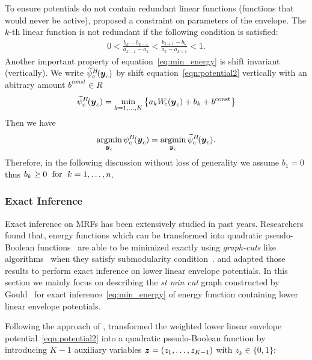 \documentclass[sigconf,anonymous,review]{acmart}
\renewcommand{\citename}{\citet}
\renewcommand{\cite}{\citep}
\begin{document}
To ensure potentials do not contain redundant linear functions
(functions that would never be active), \citename{gouldlearning}
proposed a constraint on parameters of the envelope. The $k$-th
linear function is not redundant if the following condition is
satisfied:
%
\begin{align}
    0
    <
    \frac{b_k - b_{k-1}}{a_{k-1} - a_k}
    <
    \frac{b_{k+1} - b_k}{a_k - a_{k+1}}
    <
    1.
  \label{eq:nonredundant}
\end{align}
%
Another important property of equation~\eqref{eq:min_energy} is
shift invariant (vertically). We write
$\widetilde{\psi}^{H}_c\!({\boldsymbol{y}}_c)$ by shift
equation~\eqref{eqn:potential2} vertically with an abitrary
amount $b^{const}\in R$
$$\widetilde{\psi}^{H}_c\!({\boldsymbol{y}}_c) = \min_{k=1, \ldots, K}
\left\{a_k W_{\!c}({\boldsymbol{y}}_c) + b_k + b^\textrm{const} \right\}$$
%
Then we have
\begin{align}
  \mathop{\textrm{argmin}}_{{\boldsymbol{y}}_c} \psi^H_c\!({\boldsymbol{y}}_c)
  = \mathop{\textrm{argmin}}_{{\boldsymbol{y}}_c} \widetilde{\psi}^{H}_c\!({\boldsymbol{y}}_c).
  \label{eq:shift_invariant}
\end{align}
%
Therefore, in the following discussion without loss of generality
we assume $b_1 = 0$ thus $b_k\geq0 \text{\; for \;} k=1,\dots,n$.
%
\subsubsection{Exact Inference}
\label{sec:exact_inference}

Exact inference on MRFs has been extensively studied in past
years. Researchers found that, energy functions which can be
transformed into quadratic pseudo-Boolean
functions~\cite{Ishikawa:PAMI03,Ishikawa:CVPR09,Rother:CVPR09}
are able to be minimized exactly using \emph{graph-cuts} like
algorithms~\cite{Freedman:CVPR05,Hammer:1965} when they satisfy
submodularity condition~\cite{Boros:MATH02}.
\citename{Kohli:TR08} and \citename{Gould:ICML2011} adapted those
results to perform exact inference on lower linear envelope
potentials. In this section we mainly focus on describing the
\emph{st min cut} graph constructed by
Gould~\cite{Gould:ICML2011,gouldlearning} for exact
inference~\eqref{eq:min_energy} of energy function containing
lower linear envelope potentials.

Following the approach of \citename{Kohli:CVPR10},
\citename{Gould:ICML2011,gouldlearning} transformed the weighted
lower linear envelope potential~\eqref{eqn:potential2} into a
quadratic pseudo-Boolean function by introducing $K-1$ auxiliary
variables ${\boldsymbol{z}} = \left(z_1, \ldots, z_{K-1}\right)$ with $z_k\in
\{0,1\}$:
\end{document}
